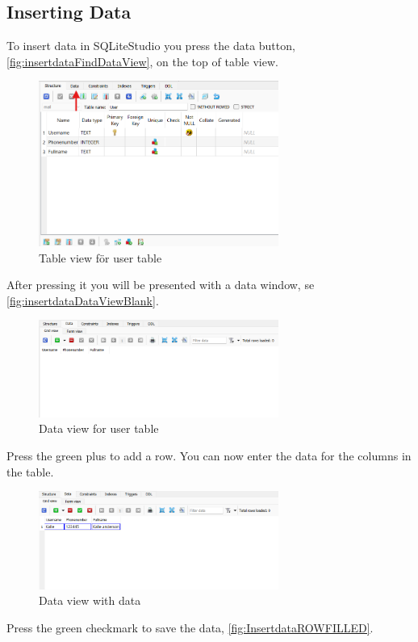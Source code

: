\documentclass[a4paper,11pt,oneside]{article}
\begin{document}
\begin{sloppypar}
\subsection{Inserting Data}
\label{sqliteStudioInsertingData}
To insert data in SQLiteStudio you press the data button,\autoref{fig:insertdataFindDataView}, on the top of table view. 
\begin{figure}[!htb]
  \centering
  \includegraphics[width=0.7\textwidth]{sqlitestudio/Insertdata/insert_data_find_view.png}
  \caption{Table view för user table}
  \label{fig:insertdataFindDataView}
\end{figure}
After pressing it you will be presented with a data window, se \autoref{fig:insertdataDataViewBlank}.
\begin{figure}[!htb]
  \centering
  \includegraphics[width=0.7\textwidth]{sqlitestudio/Insertdata/insert_data_view_blank.png}
  \caption{Data view for user table}
  \label{fig:insertdataDataViewBlank}
\end{figure}
Press the green plus to add a row. You can now enter the data for the columns in the table.
\begin{figure}[!htb]
  \centering
  \includegraphics[width=0.7\textwidth]{sqlitestudio/Insertdata/insert_data_row_populated.png}
  \caption{Data view with data}
  \label{fig:InsertdataROWFILLED}
\end{figure}
Press the green checkmark to save the data, \autoref{fig:InsertdataROWFILLED}. 
  

\end{sloppypar}
\end{document}
